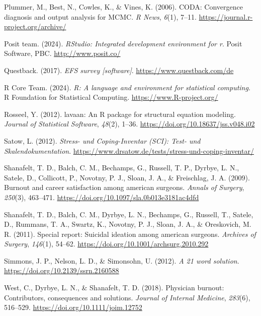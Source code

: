 \documentclass[
  man]{apa6}
\newlength{\cslhangindent}
\newenvironment{CSLReferences}[2] %
 {\begin{list}{}{%
  \setlength{\itemindent}{0pt}
  \setlength{\leftmargin}{0pt}
  \setlength{\parsep}{0pt}
  \ifodd #1
   \setlength{\leftmargin}{\cslhangindent}
   \setlength{\itemindent}{-1\cslhangindent}
  \fi
  \setlength{\itemsep}{#2\baselineskip}}}
 {\end{list}}
\begin{document}
\begin{CSLReferences}{1}{0}
Plummer, M., Best, N., Cowles, K., \& Vines, K. (2006). CODA: Convergence diagnosis and output analysis for MCMC. \emph{R News}, \emph{6}(1), 7--11. \url{https://journal.r-project.org/archive/}

Posit team. (2024). \emph{RStudio: Integrated development environment for r}. Posit Software, PBC. \url{http://www.posit.co/}

Questback. (2017). \emph{EFS survey {[}software{]}}. \url{https://www.questback.com/de}

R Core Team. (2024). \emph{R: A language and environment for statistical computing}. R Foundation for Statistical Computing. \url{https://www.R-project.org/}

Rosseel, Y. (2012). {lavaan}: An {R} package for structural equation modeling. \emph{Journal of Statistical Software}, \emph{48}(2), 1--36. \url{https://doi.org/10.18637/jss.v048.i02}

Satow, L. (2012). \emph{{Stress- und Coping-Inventar (SCI): Test- und Skalendokumentation}}. \url{https://www.drsatow.de/tests/stress-und-coping-inventar/}

Shanafelt, T. D., Balch, C. M., Bechamps, G., Russell, T. P., Dyrbye, L. N., Satele, D., Collicott, P., Novotny, P. J., Sloan, J. A., \& Freischlag, J. A. (2009). Burnout and career satisfaction among american surgeons. \emph{Annals of Surgery}, \emph{250}(3), 463--471. \url{https://doi.org/10.1097/sla.0b013e3181ac4dfd}

Shanafelt, T. D., Balch, C. M., Dyrbye, L. N., Bechamps, G., Russell, T., Satele, D., Rummans, T. A., Swartz, K., Novotny, P. J., Sloan, J. A., \& Oreskovich, M. R. (2011). Special report: Suicidal ideation among american surgeons. \emph{Archives of Surgery}, \emph{146}(1), 54--62. \url{https://doi.org/10.1001/archsurg.2010.292}

Simmons, J. P., Nelson, L. D., \& Simonsohn, U. (2012). \emph{A 21 word solution}. \url{https://doi.org/10.2139/ssrn.2160588}

West, C., Dyrbye, L. N., \& Shanafelt, T. D. (2018). Physician burnout: Contributors, consequences and solutions. \emph{Journal of Internal Medicine}, \emph{283}(6), 516--529. \url{https://doi.org/10.1111/joim.12752}


\end{CSLReferences}
\end{document}
